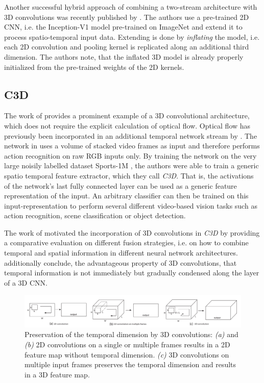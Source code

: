 Another successful hybrid approach of combining a two-stream architecture with 3D convolutions was recently published by \textcite{carreira_quo_2017}.
The authors use a pre-trained 2D CNN, i.e. the Inception-V1 model \cite{szegedy_going_2015-1} pre-trained on ImageNet and extend it to process spatio-temporal input data.
Extending is done by \textit{inflating}\textcite{carreira_quo_2017} the model, i.e. each 2D convolution and pooling kernel is replicated along an additional third dimension.
The authors note, that the inflated 3D model is already properly initialized from the pre-trained weights of the 2D kernels.


\subsection{C3D}
\label{subsec:c3d}
The work of \textcite{tran_learning_2015} provides a prominent example of a 3D convolutional architecture, which does not require the explicit calculation of optical flow.
Optical flow has previously been incorporated in an additional temporal network stream by \textcite{simonyan_two-stream_2014}.
The network in \cite{tran_learning_2015} uses a volume of stacked video frames as input and therefore performs action recognition on raw RGB inputs only.
By training the network on the very large noisily labelled dataset Sports-1M \cite{karpathy_large-scale_2014}, the authors were able to train a generic spatio temporal feature extractor, which they call \textit{C3D}.
That is, the activations of the network's last fully connected layer can be used as a generic feature representation of the input.
An arbitrary classifier can then be trained on this input-representation to perform several different video-based vision tasks such as action recognition, scene classification or object detection.

The work of \textcite{karpathy_large-scale_2014} motivated the incorporation of 3D convolutions in \textit{C3D} by providing a comparative evaluation on different fusion strategies, i.e. on how to combine temporal and spatial information in different neural network architectures.
\textcite{tran_learning_2015} additionally conclude, the advantageous property of 3D convolutions, that temporal information is not immediately but gradually condensed along the layer of a 3D CNN.

\begin{figure}[H]
    \centering
    \includegraphics[width=\textwidth]{img_related/c3d_2dconv3dconv}
    \caption{Preservation of the temporal dimension by 3D convolutions: \textit{(a)} and \textit{(b)} 2D convolutions on a single or multiple frames results in a 2D feature map without temporal dimension. \textit{(c)} 3D convolutions on multiple input frames preserves the temporal dimension and results in a 3D feature map. \cite{tran_learning_2015}}
    \label{fig:c3d_2dconv3dconv}
\end{figure}

